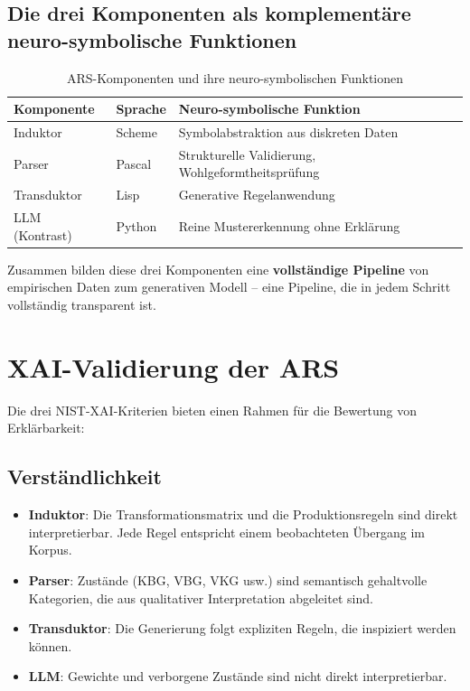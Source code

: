 \documentclass[12pt,a4paper]{article}
\begin{document}
\subsection{Die drei Komponenten als komplementäre neuro-symbolische Funktionen}

\begin{table}[H]
\centering
\caption{ARS-Komponenten und ihre neuro-symbolischen Funktionen}
\label{tab:components}
\begin{tabular}{@{} p{3cm} p{4cm} p{6cm} @{}}
\toprule
\textbf{Komponente} & \textbf{Sprache} & \textbf{Neuro-symbolische Funktion} \\
\midrule
Induktor & Scheme & Symbolabstraktion aus diskreten Daten \\
Parser & Pascal & Strukturelle Validierung, Wohlgeformtheitsprüfung \\
Transduktor & Lisp & Generative Regelanwendung \\
LLM (Kontrast) & Python & Reine Mustererkennung ohne Erklärung \\
\bottomrule
\end{tabular}
\end{table}

Zusammen bilden diese drei Komponenten eine \textbf{vollständige Pipeline} von 
empirischen Daten zum generativen Modell – eine Pipeline, die in jedem Schritt 
vollständig transparent ist.

\section{XAI-Validierung der ARS}

Die drei NIST-XAI-Kriterien \citep{ortigossa2024xai} bieten einen Rahmen für 
die Bewertung von Erklärbarkeit:

\subsection{Verständlichkeit}

\begin{itemize}
    \item \textbf{Induktor}: Die Transformationsmatrix und die Produktionsregeln 
    sind direkt interpretierbar. Jede Regel entspricht einem beobachteten 
    Übergang im Korpus.
    \item \textbf{Parser}: Zustände (KBG, VBG, VKG usw.) sind semantisch 
    gehaltvolle Kategorien, die aus qualitativer Interpretation abgeleitet sind.
    \item \textbf{Transduktor}: Die Generierung folgt expliziten Regeln, die 
    inspiziert werden können.
    \item \textbf{LLM}: Gewichte und verborgene Zustände sind nicht direkt 
    interpretierbar.
\end{itemize}
\end{document}
